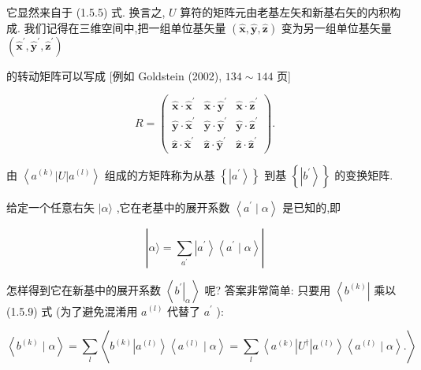 \documentclass[lang=cn,newtx,10pt,scheme=chinese,thmcnt=section]{elegantbook}
\begin{document}
它显然来自于 (1.5.5) 式. 换言之, $U$ 算符的矩阵元由老基左矢和新基右矢的内积构成. 我们记得在三维空间中,把一组单位基矢量 $\left( {\widehat{\mathbf{x}},\widehat{\mathbf{y}},\widehat{\mathbf{z}}}\right)$ 变为另一组单位基矢量 $\left( {{\widehat{\mathbf{x}}}^{\prime },{\widehat{\mathbf{y}}}^{\prime },{\widehat{\mathbf{z}}}^{\prime }}\right)$

的转动矩阵可以写成 [例如 Goldstein (2002), ${134} \sim {144}$ 页]

$$
R = \left( \begin{array}{lll} \widehat{\mathbf{x}} \cdot {\widehat{\mathbf{x}}}^{\prime } & \widehat{\mathbf{x}} \cdot {\widehat{\mathbf{y}}}^{\prime } & \widehat{\mathbf{x}} \cdot {\widehat{\mathbf{z}}}^{\prime } \\ \widehat{\mathbf{y}} \cdot {\widehat{\mathbf{x}}}^{\prime } & \widehat{\mathbf{y}} \cdot {\widehat{\mathbf{y}}}^{\prime } & \widehat{\mathbf{y}} \cdot {\widehat{\mathbf{z}}}^{\prime } \\ \widehat{\mathbf{z}} \cdot {\widehat{\mathbf{x}}}^{\prime } & \widehat{\mathbf{z}} \cdot {\widehat{\mathbf{y}}}^{\prime } & \widehat{\mathbf{z}} \cdot {\widehat{\mathbf{z}}}^{\prime } \end{array}\right) . \tag{1.5.8}
$$

由 $\left\langle {{a}^{\left( k\right) }\left| U\right| {a}^{\left( l\right) }}\right\rangle$ 组成的方矩阵称为从基 $\left\{ \left| {a}^{\prime }\right\rangle \right\}$ 到基 $\left\{ \left| {b}^{\prime }\right\rangle \right\}$ 的变换矩阵.

给定一个任意右矢 $|\alpha \rangle$ ,它在老基中的展开系数 $\left\langle {{a}^{\prime } \mid \alpha }\right\rangle$ 是已知的,即

$$
\left| {\alpha \rangle = \mathop{\sum }\limits_{{a}^{\prime }}\left| {a}^{\prime }\right\rangle \left\langle {{a}^{\prime } \mid \alpha }\right\rangle }\right| \tag{1.5.9}
$$

怎样得到它在新基中的展开系数 $\left\langle {\left. {b}^{\prime }\right| }_{\alpha }\right\rangle$ 呢? 答案非常简单: 只要用 $\left\langle {b}^{\left( k\right) }\right|$ 乘以 (1.5.9) 式 (为了避免混淆用 ${a}^{\left( l\right) }$ 代替了 ${a}^{\prime }$ ):

$$
\left\langle {{b}^{\left( k\right) } \mid \alpha }\right\rangle = \mathop{\sum }\limits_{l}\left\langle {{b}^{\left( k\right) }\left| {a}^{\left( l\right) }\right\rangle \left\langle {{a}^{\left( l\right) } \mid \alpha }\right\rangle = \mathop{\sum }\limits_{l}\left\langle {{a}^{\left( k\right) }\left| {U}^{ \dagger }\right| {a}^{\left( l\right) }}\right\rangle \left\langle {{a}^{\left( l\right) } \mid \alpha }\right\rangle .}\right\rangle \tag{1.5.10}
$$
\end{document}
